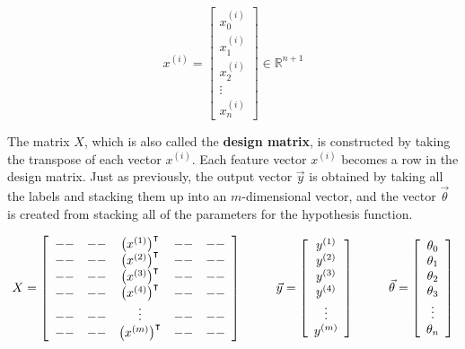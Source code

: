 \begin{equation}
x^{\left(i\right)} = \left[\begin{array}{c} x_0^{\left(i\right)} \\ x_1^{\left(i\right)} \\ x_2^{\left(i\right)} \\ \vdots \\ x_n^{\left(i\right)} \end{array}\right] \in \mathbb{R}^{n+1}
\end{equation}

The matrix $X$, which is also called the \textbf{design matrix}, is constructed by taking the transpose of each vector $x^{\left(i\right)}$. Each feature vector $x^{\left(i\right)}$ becomes a row in the design matrix. Just as previously, the output vector $\vec{y}$ is obtained by taking all the labels and stacking them up into an $m$-dimensional vector, and the vector $\vec{\theta}$ is created from stacking all of the parameters for the hypothesis function. 

\begin{equation}
X = \left[\begin{array}{ccccc}
-- & -- & \left(x^{\left(1\right)}\right)^\intercal & -- & -- \\
-- & -- & \left(x^{\left(2\right)}\right)^\intercal & -- & -- \\
-- & -- & \left(x^{\left(3\right)}\right)^\intercal & -- & -- \\
-- & -- & \left(x^{\left(4\right)}\right)^\intercal & -- & -- \\
-- & -- & \vdots & -- & -- \\
-- & -- & \left(x^{\left(m\right)}\right)^\intercal & -- & -- 
\end{array}\right]
~~\mbox{\;\;\;\;\;}~~
\vec{y} = \left[\begin{array}{c} y^{\left(1\right)} \\ y^{\left(2\right)} \\ y^{\left(3\right)} \\ y^{\left(4\right)} \\ \vdots \\ y^{\left(m\right)} \end{array}\right]
~~\mbox{\;\;\;\;\;}~~
\vec{\theta} = \left[\begin{array}{c} \theta_0 \\ \theta_1 \\ \theta_2 \\ \theta_3 \\ \vdots \\ \theta_n \end{array}\right]
\end{equation}


